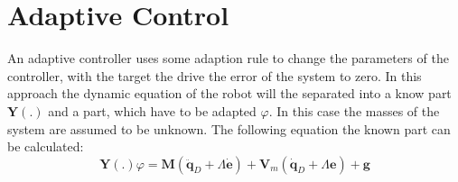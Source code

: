 \chapter{ Adaptive Control}

An adaptive controller uses some adaption rule to change the parameters of the controller, with the target the drive the error of the system to zero. In this approach the dynamic equation of the robot will the separated into a know part  $\mathbf{Y}(.)$ and a part, which have to be adapted $\varphi$. In this case the masses of the system are assumed to be unknown. 
The following equation the known part can be calculated:
\begin{equation*}
\mathbf{Y}(.)\varphi = \mathbf{M}(\ddot{\mathbf{q}}_D + \Lambda \dot{\mathbf{e}}) + \mathbf{V}_m(\dot{\mathbf{q}}_D + \Lambda \mathbf{e})+ \mathbf{g}
\end{equation*}

